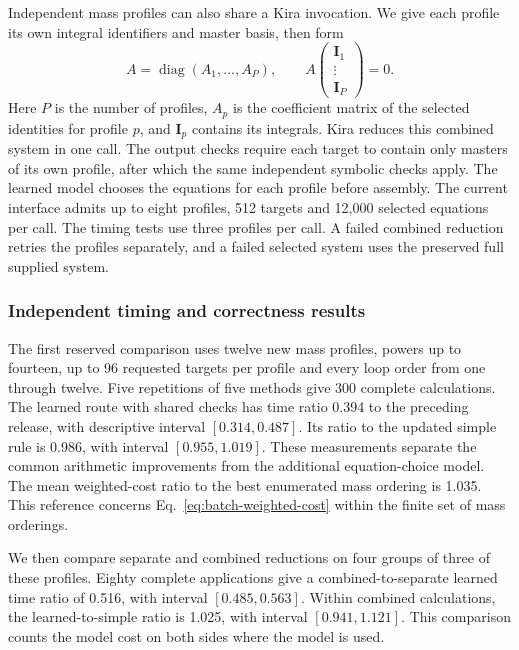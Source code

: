 Independent mass profiles can also share a Kira invocation. We give each
profile its own integral identifiers and master basis, then form
\begin{equation}
 A=\operatorname{diag}(A_1,\ldots,A_P),\qquad
 A\begin{pmatrix}\boldsymbol I_1\\ \vdots\\ \boldsymbol I_P\end{pmatrix}
 =0.
 \label{eq:batch-independent-systems}
\end{equation}
Here \(P\) is the number of profiles, \(A_p\) is the coefficient matrix
of the selected identities for profile \(p\), and \(\boldsymbol I_p\)
contains its integrals. Kira reduces this combined system in one call.
The output checks require each target to contain only masters of its own
profile, after which the same independent symbolic checks apply.
The learned model chooses the equations for each profile before assembly.
The current interface admits up to eight profiles, 512 targets and
12,000 selected equations per call. The timing tests use three profiles
per call. A failed combined reduction retries the profiles separately,
and a failed selected system uses the preserved full supplied system.

\subsubsection{Independent timing and correctness results}
The first reserved comparison uses twelve new mass profiles, powers up to
fourteen, up to 96 requested targets per profile and every loop order
from one through twelve. Five repetitions of five methods give 300
complete calculations. The learned route with shared checks has time
ratio 0.394 to the preceding release, with descriptive interval
\([0.314,0.487]\). Its ratio to the updated simple rule is 0.986,
with interval \([0.955,1.019]\). These measurements separate the common
arithmetic improvements from the additional equation-choice model.
The mean weighted-cost ratio to the best enumerated mass ordering is
1.035. This reference concerns Eq.~\eqref{eq:batch-weighted-cost}
within the finite set of mass orderings.

We then compare separate and combined reductions on four groups of
three of these profiles. Eighty complete applications give a
combined-to-separate learned time ratio of 0.516, with interval
\([0.485,0.563]\). Within combined calculations, the learned-to-simple ratio
is 1.025, with interval \([0.941,1.121]\). This comparison counts
the model cost on both sides where the model is used.

